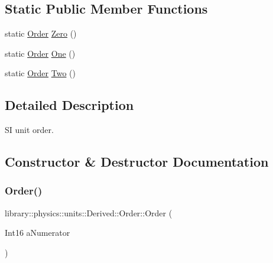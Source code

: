 \subsection*{Static Public Member Functions}
\begin{DoxyCompactItemize}
\item 
static \hyperlink{classlibrary_1_1physics_1_1units_1_1_derived_1_1_order}{Order} \hyperlink{classlibrary_1_1physics_1_1units_1_1_derived_1_1_order_ad001256340bff8a9c55156f9c45d4969}{Zero} ()
\item 
static \hyperlink{classlibrary_1_1physics_1_1units_1_1_derived_1_1_order}{Order} \hyperlink{classlibrary_1_1physics_1_1units_1_1_derived_1_1_order_a58b662bddd1007dbee30db2901f6f3b2}{One} ()
\item 
static \hyperlink{classlibrary_1_1physics_1_1units_1_1_derived_1_1_order}{Order} \hyperlink{classlibrary_1_1physics_1_1units_1_1_derived_1_1_order_a07b2f59781181672421267cdf7bda738}{Two} ()
\end{DoxyCompactItemize}


\subsection{Detailed Description}
SI unit order. 

\subsection{Constructor \& Destructor Documentation}
\mbox{\label{classlibrary_1_1physics_1_1units_1_1_derived_1_1_order_adf904bd5a124a6fa6b73e376fa6f94d4}} 
\subsubsection{\texorpdfstring{Order()}{Order()}\hspace{0.1cm}{\footnotesize\ttfamily [1/2]}}
{\footnotesize\ttfamily library\+::physics\+::units\+::\+Derived\+::\+Order\+::\+Order (\begin{DoxyParamCaption}\item[{Int16}]{a\+Numerator }\end{DoxyParamCaption})}

